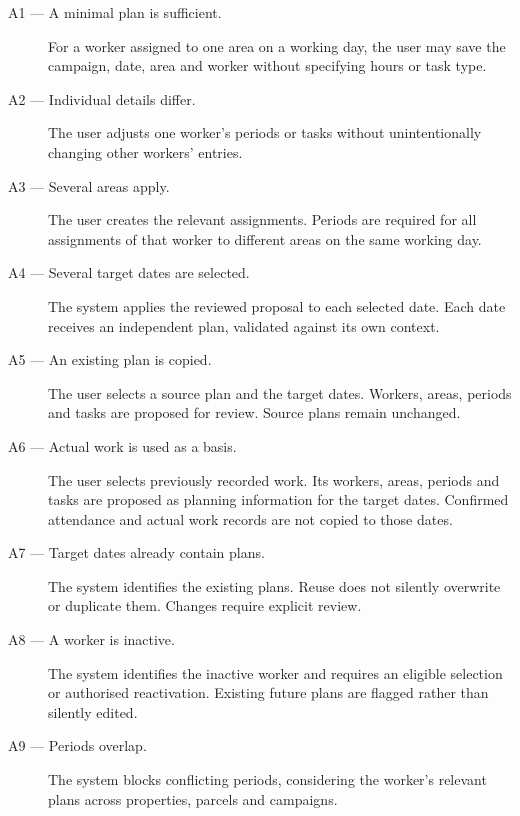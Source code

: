 \begin{description}

    \item[A1 --- A minimal plan is sufficient.]
    For a worker assigned to one area
    on a working day, the user may save
    the campaign, date, area and worker
    without specifying hours or task type.

    \item[A2 --- Individual details differ.]
    The user adjusts one worker's periods
    or tasks without unintentionally changing
    other workers' entries.

    \item[A3 --- Several areas apply.]
    The user creates the relevant assignments.
    Periods are required for all assignments
    of that worker to different areas
    on the same working day.

    \item[A4 --- Several target dates are selected.]
    The system applies the reviewed proposal
    to each selected date.
    Each date receives an independent plan,
    validated against its own context.

    \item[A5 --- An existing plan is copied.]
    The user selects a source plan
    and the target dates.
    Workers, areas, periods and tasks
    are proposed for review.
    Source plans remain unchanged.

    \item[A6 --- Actual work is used as a basis.]
    The user selects previously recorded work.
    Its workers, areas, periods and tasks
    are proposed as planning information
    for the target dates.
    Confirmed attendance and actual work records
    are not copied to those dates.

    \item[A7 --- Target dates already contain plans.]
    The system identifies the existing plans.
    Reuse does not silently overwrite
    or duplicate them.
    Changes require explicit review.

    \item[A8 --- A worker is inactive.]
    The system identifies the inactive worker
    and requires an eligible selection
    or authorised reactivation.
    Existing future plans are flagged
    rather than silently edited.

    \item[A9 --- Periods overlap.]
    The system blocks conflicting periods,
    considering the worker's relevant plans
    across properties, parcels and campaigns.


\end{description}
